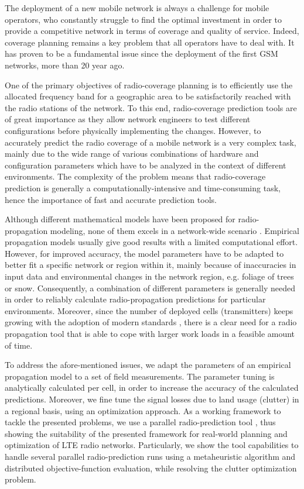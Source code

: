 The deployment of a new mobile network is always a challenge for mobile
operators, who constantly struggle to find the optimal investment
in order to provide a competitive network in terms of coverage and
quality of service. Indeed, coverage planning remains a key problem
that all operators have to deal with. It has proven to be a fundamental
issue since the deployment of the first GSM networks, more than 20
year ago.

One of the primary objectives of radio-coverage planning is to efficiently
use the allocated frequency band for a geographic area to be satisfactorily
reached with the radio stations of the network. To this end, radio-coverage
prediction tools are of great importance as they allow network engineers
to test different configurations before physically implementing the
changes. However, to accurately predict the radio coverage of a mobile
network is a very complex task, mainly due to the wide range of various
combinations of hardware and configuration parameters which have to
be analyzed in the context of different environments. The complexity
of the problem means that radio-coverage prediction is generally a
computationally-intensive and time-consuming task, hence the importance
of fast and accurate prediction tools.

Although different mathematical models have been proposed for radio-propagation
modeling, none of them excels in a network-wide scenario \cite{Shabbir_Comparison_of_radio_propagation_models:2011}.
Empirical propagation models usually give good results with a limited
computational effort. However, for improved accuracy, the model parameters
have to be adapted to better fit a specific network or region within
it, mainly because of inaccuracies in input data and environmental
changes in the network region, e.g. foliage of trees or snow. Consequently,
a combination of different parameters is generally needed in order
to reliably calculate radio-propagation predictions for particular
environments. Moreover, since the number of deployed cells (transmitters)
keeps growing with the adoption of modern standards \cite{Saleh_On_the_coveraga_extension_in_LTE_networks:2010},
there is a clear need for a radio propagation tool that is able to
cope with larger work loads in a feasible amount of time.

To address the afore-mentioned issues, we adapt the parameters of
an empirical propagation model to a set of field measurements. The
parameter tuning is analytically calculated per cell, in order to
increase the accuracy of the calculated predictions. Moreover, we
fine tune the signal losses due to land usage (clutter) in a regional
basis, using an optimization approach. As a working framework to tackle
the presented problems, we use a parallel radio-prediction tool \cite{Benedicic-A_GRASS_GIS_parallel_module_for_radio-propagation_predictions:2013},
thus showing the suitability of the presented framework for real-world
planning and optimization of LTE radio networks. Particularly, we
show the tool capabilities to handle several parallel radio-prediction
runs using a metaheuristic algorithm and distributed objective-function
evaluation, while resolving the clutter optimization problem.

